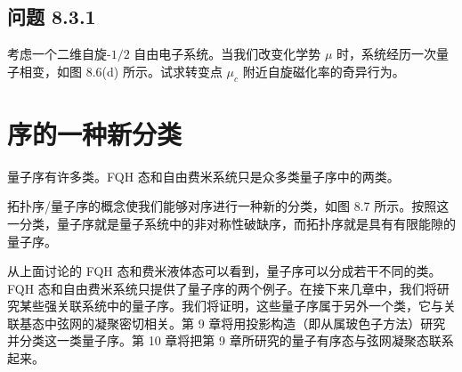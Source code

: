 \subsection*{问题 8.3.1}

考虑一个二维自旋-$1/2$ 自由电子系统。当我们改变化学势 $\mu$ 时，系统经历一次量子相变，如图 8.6(d) 所示。试求转变点 $\mu_{c}$ 附近自旋磁化率的奇异行为。

\section{序的一种新分类}

\begin{keypoints}
\item 量子序有许多类。FQH 态和自由费米系统只是众多类量子序中的两类。
\end{keypoints}

拓扑序/量子序的概念使我们能够对序进行一种新的分类，如图 8.7 所示。按照这一分类，量子序就是量子系统中的非对称性破缺序，而拓扑序就是具有有限能隙的量子序。

从上面讨论的 FQH 态和费米液体态可以看到，量子序可以分成若干不同的类。FQH 态和自由费米系统只提供了量子序的两个例子。在接下来几章中，我们将研究某些强关联系统中的量子序。我们将证明，这些量子序属于另外一个类，它与关联基态中弦网的凝聚密切相关。第 9 章将用投影构造（即从属玻色子方法）研究并分类这一类量子序。第 10 章将把第 9 章所研究的量子有序态与弦网凝聚态联系起来。
